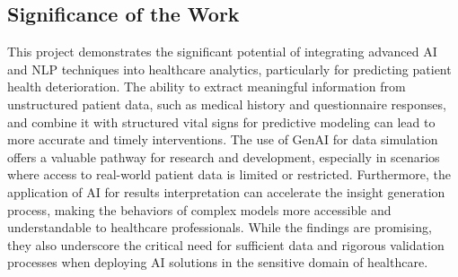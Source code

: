 \subsection{Significance of the Work}

This project demonstrates the significant potential of integrating advanced AI and NLP techniques into healthcare analytics, particularly for predicting patient health deterioration. The ability to extract meaningful information from unstructured patient data, such as medical history and questionnaire responses, and combine it with structured vital signs for predictive modeling can lead to more accurate and timely interventions. The use of GenAI for data simulation offers a valuable pathway for research and development, especially in scenarios where access to real-world patient data is limited or restricted. Furthermore, the application of AI for results interpretation can accelerate the insight generation process, making the behaviors of complex models more accessible and understandable to healthcare professionals. While the findings are promising, they also underscore the critical need for sufficient data and rigorous validation processes when deploying AI solutions in the sensitive domain of healthcare.